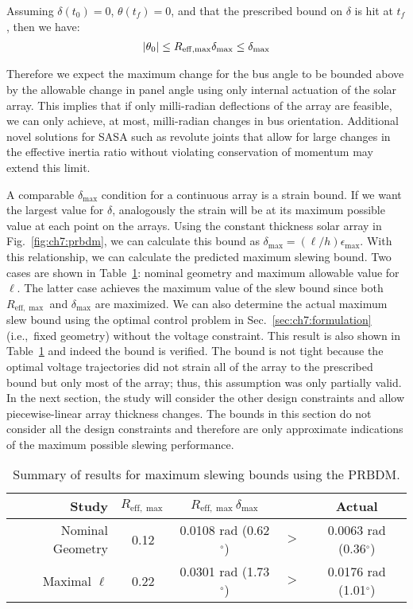\noindent Assuming $\delta(t_0) = 0$, $\theta(t_f) = 0$, and that the prescribed bound on $\delta$ is hit at $t_f$, then we have:
\begin{align}
\lvert\theta_0\rvert \leq R_{\mathrm{eff},\max} \delta_{\max} \leq \delta_{\max}
\end{align}

\noindent Therefore we expect the maximum change for the bus angle to be bounded above by the allowable change in panel angle using only internal actuation of the solar array. This implies that if only milli-radian deflections of the array are feasible, we can only achieve, at most, milli-radian changes in bus orientation. Additional novel solutions for SASA such as revolute joints that allow for large changes in the effective inertia ratio without violating conservation of momentum may extend this limit. 

A comparable $\delta_{\max}$ condition for a continuous array is a strain bound. If we want the largest value for $\delta$, analogously the strain will be at its maximum possible value at each point on the arrays. Using the constant thickness solar array in Fig.~\ref{fig:ch7:prbdm}, we can calculate this bound as $\delta_{\max} = (\ell/h) \epsilon_{\max}$. With this relationship, we can calculate the predicted maximum slewing bound. Two cases are shown in Table~\ref{tb:ch7:prbdm}: nominal geometry and maximum allowable value for $\ell$. The latter case achieves the maximum value of the slew bound since both $R_{\mathrm{eff,\max}}$ and $\delta_{\max}$ are maximized. We can also determine the actual maximum slew bound using the optimal control problem in Sec.~\ref{sec:ch7:formulation} (i.e.,~fixed geometry) without the voltage constraint. This result is also shown in Table~\ref{tb:ch7:prbdm} and indeed the bound is verified. The bound is not tight because the optimal voltage trajectories did not strain all of the array to the prescribed bound but only most of the array; thus, this assumption was only partially valid. 
In the next section, the study will consider the other design constraints and allow  piecewise-linear array thickness changes. The bounds in this section do not consider all the design constraints and therefore are only approximate indications of the maximum possible slewing performance.

\begin{table}
\caption{Summary of results for maximum slewing bounds using the PRBDM. \label{tb:ch7:prbdm}}
\centering
\begin{tabular}{rcccc}
\hline \hline
Study & $R_{\mathrm{eff},\max}$ & $R_{\mathrm{eff},\max} \delta_{\max}$ & & Actual \\ 
\hline
Nominal Geometry & 0.12 & 0.0108 rad (0.62$^\circ$) & $>$ & 0.0063 rad (0.36$^\circ$) \\  
Maximal $\ell$ & 0.22 & 0.0301 rad (1.73$^\circ$) & $>$ & 0.0176 rad (1.01$^\circ$) \\
\hline \hline
\end{tabular}
\end{table}

